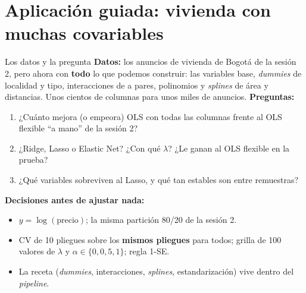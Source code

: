 \documentclass{beamer}
\newcommand{\1}{\mathbb{I}}
\begin{document}
\section{Aplicación guiada: vivienda con muchas covariables}
\begin{frame}[noframenumbering]
\tableofcontents[currentsection]
\end{frame}

\begin{frame}{Los datos y la pregunta}
\small
\textbf{Datos:} los anuncios de vivienda de Bogotá de la sesión 2, pero ahora con \textbf{todo} lo que podemos construir: las variables base, \emph{dummies} de localidad y tipo, interacciones de a pares, polinomios y \emph{splines} de área y distancias. Unos cientos de columnas para unos miles de anuncios.
\pause
\vspace{0.1cm}
\textbf{Preguntas:}
\begin{enumerate}\itemsep3pt
  \item ¿Cuánto mejora (o empeora) OLS con todas las columnas frente al OLS flexible ``a mano'' de la sesión 2?
  \item ¿Ridge, Lasso o Elastic Net? ¿Con qué $\lambda$? ¿Le ganan al OLS flexible en la prueba?
  \item ¿Qué variables sobreviven al Lasso, y qué tan estables son entre remuestras?
\end{enumerate}
\pause
\vspace{0.1cm}
\textbf{Decisiones antes de ajustar nada:}
\begin{itemize}\itemsep2pt
  \item $y = \log(\text{precio})$; la misma partición 80/20 de la sesión 2.
  \item CV de 10 pliegues sobre los \textbf{mismos pliegues} para todos; grilla de 100 valores de $\lambda$ y $\alpha \in \{0, 0{,}5, 1\}$; regla 1-SE.
  \item La receta (\emph{dummies}, interacciones, \emph{splines}, estandarización) vive dentro del \emph{pipeline}.
\end{itemize}
\end{frame}
\end{document}
